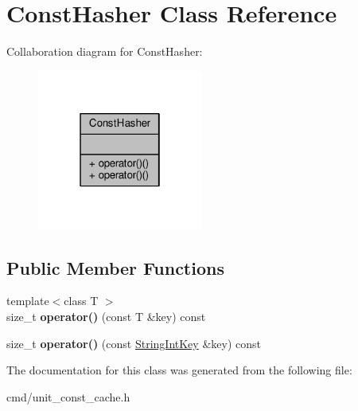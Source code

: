 \hypertarget{classConstHasher}{}\section{Const\+Hasher Class Reference}
\label{classConstHasher}


Collaboration diagram for Const\+Hasher\+:
\nopagebreak
\begin{figure}[H]
\begin{center}
\leavevmode
\includegraphics[width=154pt]{de/d3a/classConstHasher__coll__graph}
\end{center}
\end{figure}
\subsection*{Public Member Functions}
\begin{DoxyCompactItemize}
\item 
{\footnotesize template$<$class T $>$ }\\size\+\_\+t {\bfseries operator()} (const T \&key) const \hypertarget{classConstHasher_aaa59c75fb4def76ec2aeadb81150a36d}{}\label{classConstHasher_aaa59c75fb4def76ec2aeadb81150a36d}

\item 
size\+\_\+t {\bfseries operator()} (const \hyperlink{classStringIntKey}{String\+Int\+Key} \&key) const \hypertarget{classConstHasher_a8e1c539542acdec482932a1e835bfada}{}\label{classConstHasher_a8e1c539542acdec482932a1e835bfada}

\end{DoxyCompactItemize}


The documentation for this class was generated from the following file\+:\begin{DoxyCompactItemize}
\item 
cmd/unit\+\_\+const\+\_\+cache.\+h\end{DoxyCompactItemize}
